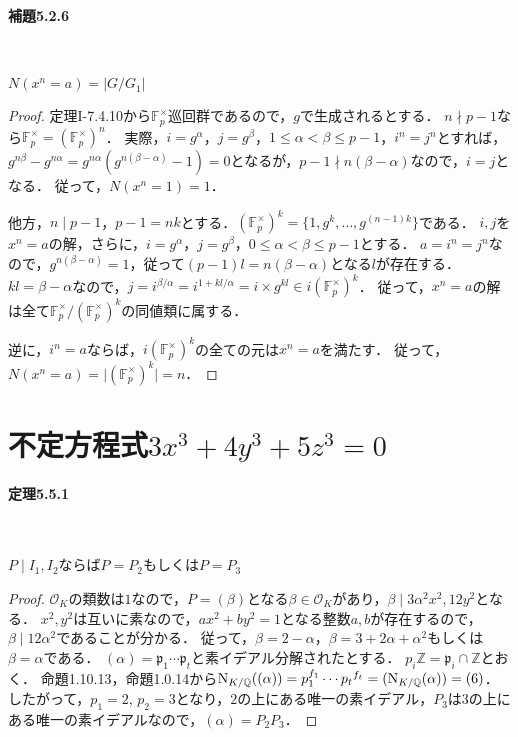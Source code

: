 \paragraph{補題5.2.6}~
\begin{screen}
  $N(x^n=a)=\lvert G/G_1\rvert$
\end{screen}
\begin{proof}
  定理I-7.4.10から$\mathbb{F}_p^\times$巡回群であるので，$g$で生成されるとする．
  $n\nmid p-1$なら$\mathbb{F}_p^\times=(\mathbb{F}_p^\times)^n$．
  実際，$i=g^\alpha$，$j=g^\beta$，$1\leq\alpha <\beta\leq p-1$，$i^n = j^n$とすれば，$g^{n\beta}-g^{n\alpha}=g^{n\alpha}(g^{n(\beta-\alpha)} - 1)=0$となるが，$p-1\nmid n(\beta-\alpha)$なので，$i= j$となる．
  従って，$N(x^n=1)=1$．

  他方，$n\mid p-1$，$p-1=nk$とする．$(\mathbb{F}_p^\times)^k=\{1,g^k,\ldots,g^{(n-1)k}\}$である．
  $i,j$を$x^n=a$の解，さらに，$i=g^\alpha$，$j=g^\beta$，$0\leq\alpha <\beta\leq p-1$とする．
  $a = i^n = j^n$なので，$g^{n(\beta-\alpha)} =1$，従って$(p-1)l = n(\beta-\alpha)$となる$l$が存在する．
  $kl=\beta-\alpha$なので，$j=i^{\beta/\alpha}=i^{1+kl/\alpha}=i\times g^{kl}\in i(\mathbb{F}_p^\times)^k$．
  従って，$x^n=a$の解は全て$\mathbb{F}_p^\times/(\mathbb{F}_p^\times)^k$の同値類に属する．

  逆に，$i^n=a$ならば，$i(\mathbb{F}_p^\times)^k$の全ての元は$x^n=a$を満たす．
  従って，$N(x^n=a)=\lvert(\mathbb{F}_p^\times)^k\rvert=n$．
\end{proof}

\setcounter{section}{4}
\section{不定方程式$3x^3 + 4y^3 + 5z^3 = 0$}
\paragraph{定理5.5.1}~
\begin{screen}
  $P\mid I_1, I_2$ならば$P=P_2$もしくは$P=P_3$
\end{screen}
\begin{proof}
  $\mathcal{O}_K$の類数は$1$なので，$P=(\beta)$となる$\beta\in\mathcal{O}_K$があり，$\beta\mid 3\alpha^2x^2, 12y^2$となる．
  $x^2, y^2$は互いに素なので，$ax^2+by^2=1$となる整数$a, b$が存在するので，$\beta\mid 12\alpha^2$であることが分かる．
  従って，$\beta=2-\alpha$，$\beta=3+2\alpha+\alpha^2$もしくは$\beta=\alpha$である．
  $(\alpha)=\mathfrak{p}_1{}\cdots\mathfrak{p}_t$と素イデアル分解されたとする．
  $p_i\mathbb{Z}=\mathfrak{p}_i\cap\mathbb{Z}$とおく．
  命題1.10.13，命題1.0.14から$\operatorname{N}_{K/\mathbb{Q}}((\alpha))=p_1^{f_1}\cdots p_t{}^{f_t}=(\operatorname{N}_{K/\mathbb{Q}}(\alpha))=(6)$．
  したがって，$p_1=2$, $p_2=3$となり，$2$の上にある唯一の素イデアル，$P_3$は$3$の上にある唯一の素イデアルなので，$(\alpha)=P_2P_3$．
\end{proof}

